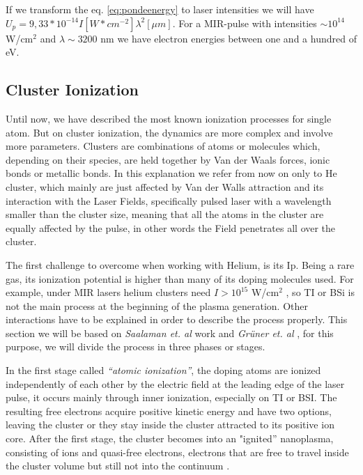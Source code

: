 If we transform the eq. \ref{eq:pondeenergy} to laser intensities we will have $U_{p} = 9,33*10^{-14} I[W*cm^{-2}] \lambda^{2}[\mu m]$. For a MIR-pulse with intensities $\sim 10^{14}$ W/cm$^{2}$ and $\lambda \sim 3200$ nm we have electron energies between one and a hundred of eV.

\subsection{Cluster Ionization}

Until now, we have described the most known ionization processes for single atom. But on cluster ionization, the dynamics are more complex and involve more parameters. Clusters are combinations of atoms or molecules which, depending on their species, are held together by Van der Waals forces, ionic bonds or metallic bonds. In this explanation we refer from now on only to He cluster, which mainly are just affected by Van der Walls attraction\cite{stienkemeier_spectroscopy_2006} and its interaction with the Laser Fields, specifically pulsed laser with  a wavelength smaller than the cluster size, meaning that all the atoms in the cluster are equally affected by the pulse, in other words the Field penetrates all over the cluster.

The first challenge to overcome when working with Helium, is its Ip. Being a rare gas, its ionization potential is higher than many of its doping molecules used. For example, under MIR lasers helium clusters need $I > 10^{15}$ W/cm$^{2}$ , so TI or BSi is not the main process at the beginning of the plasma generation. Other interactions have to be explained in order to describe the process properly. This section we will be based on \textit{Saalaman et. al} work \cite{saalmann_mechanisms_2006} and \textit{Grüner et. al} \cite{gruner_femtosekundenspektroskopie_2013}, for this purpose, we will divide the process in three phases or stages.


In the first stage called \textit{“atomic ionization”}, the doping atoms are ionized independently of each other by the electric field at the leading edge of the laser pulse, it occurs mainly through inner ionization, especially on TI or BSI. The resulting free electrons acquire positive kinetic energy and have two options, leaving the cluster or they stay inside the cluster attracted to its positive ion core. After the first stage, the cluster becomes into an "ignited” nanoplasma, consisting of ions and quasi-free electrons, electrons that are free to travel inside the cluster volume but still not into the continuum \cite{last_quasiresonance_1999}. 


